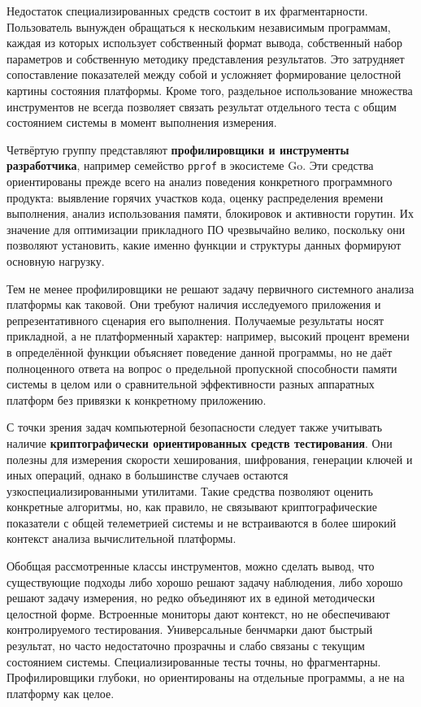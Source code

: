 Недостаток специализированных средств состоит в их фрагментарности. Пользователь вынужден обращаться к нескольким независимым программам, каждая из которых использует собственный формат вывода, собственный набор параметров и собственную методику представления результатов. Это затрудняет сопоставление показателей между собой и усложняет формирование целостной картины состояния платформы. Кроме того, раздельное использование множества инструментов не всегда позволяет связать результат отдельного теста с общим состоянием системы в момент выполнения измерения.

Четвёртую группу представляют \textbf{профилировщики и инструменты разработчика}, например семейство \texttt{pprof} в экосистеме Go. Эти средства ориентированы прежде всего на анализ поведения конкретного программного продукта: выявление горячих участков кода, оценку распределения времени выполнения, анализ использования памяти, блокировок и активности горутин. Их значение для оптимизации прикладного ПО чрезвычайно велико, поскольку они позволяют установить, какие именно функции и структуры данных формируют основную нагрузку.

Тем не менее профилировщики не решают задачу первичного системного анализа платформы как таковой. Они требуют наличия исследуемого приложения и репрезентативного сценария его выполнения. Получаемые результаты носят прикладной, а не платформенный характер: например, высокий процент времени в определённой функции объясняет поведение данной программы, но не даёт полноценного ответа на вопрос о предельной пропускной способности памяти системы в целом или о сравнительной эффективности разных аппаратных платформ без привязки к конкретному приложению.

С точки зрения задач компьютерной безопасности следует также учитывать наличие \textbf{криптографически ориентированных средств тестирования}. Они полезны для измерения скорости хеширования, шифрования, генерации ключей и иных операций, однако в большинстве случаев остаются узкоспециализированными утилитами. Такие средства позволяют оценить конкретные алгоритмы, но, как правило, не связывают криптографические показатели с общей телеметрией системы и не встраиваются в более широкий контекст анализа вычислительной платформы.

Обобщая рассмотренные классы инструментов, можно сделать вывод, что существующие подходы либо хорошо решают задачу наблюдения, либо хорошо решают задачу измерения, но редко объединяют их в единой методически целостной форме. Встроенные мониторы дают контекст, но не обеспечивают контролируемого тестирования. Универсальные бенчмарки дают быстрый результат, но часто недостаточно прозрачны и слабо связаны с текущим состоянием системы. Специализированные тесты точны, но фрагментарны. Профилировщики глубоки, но ориентированы на отдельные программы, а не на платформу как целое.

